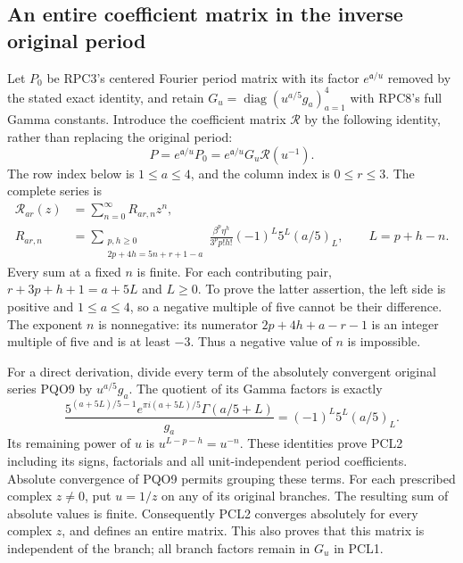 \subsection{An entire coefficient matrix in the inverse original period}
Let $P_0$ be RPC3's centered Fourier period matrix with its factor
$e^{\mathfrak a/u}$ removed by the stated exact identity, and retain
$G_u=\operatorname{diag}(u^{a/5}g_a)_{a=1}^4$ with RPC8's full
Gamma constants. Introduce the coefficient matrix $\mathcal R$ by
the following identity, rather than replacing the original period:
\[
 P= e^{\mathfrak a/u}P_0
   = e^{\mathfrak a/u}G_u\mathcal R(u^{-1}).
 \tag{PCL1}
\]
The row index below is $1\le a\le4$, and the column index is
$0\le r\le3$. The complete series is
\[
 \begin{split}
 \mathcal R_{a r}(z)&=\sum_{n=0}^{\infty}R_{a r,n}z^n,\\
 R_{a r,n}&=
 \sum_{\substack{p,h\ge0\\2p+4h=5n+r+1-a}}
 \frac{\beta^p\eta^h}{3^p p!h!}
      (-1)^{L}5^L(a/5)_L,
 \qquad L=p+h-n.
 \end{split}\tag{PCL2}
\]
Every sum at a fixed $n$ is finite. For each contributing pair,
$r+3p+h+1=a+5L$ and $L\ge0$. To prove the latter assertion,
the left side is positive and $1\le a\le4$, so a negative multiple
of five cannot be their difference. The exponent $n$ is nonnegative:
its numerator $2p+4h+a-r-1$ is an integer multiple of five and is
at least $-3$. Thus a negative value of $n$ is impossible.

For a direct derivation, divide every term of the absolutely
convergent original series PQO9 by $u^{a/5}g_a$. The quotient of
its Gamma factors is exactly
\[
 \frac{5^{(a+5L)/5-1}e^{\pi i(a+5L)/5}
                  \Gamma(a/5+L)}{g_a}
        =(-1)^L5^L(a/5)_L.
 \tag{PCL3}
\]
Its remaining power of $u$ is $u^{L-p-h}=u^{-n}$.
These identities prove PCL2 including its signs, factorials and
all unit-independent period coefficients. Absolute convergence of
PQO9 permits grouping these terms. For each prescribed complex
$z\ne0$, put $u=1/z$ on any of its original branches. The resulting
sum of absolute values is finite. Consequently PCL2 converges
absolutely for every complex $z$, and defines an entire matrix.
This also proves that this matrix is independent of the branch;
all branch factors remain in $G_u$ in PCL1.

